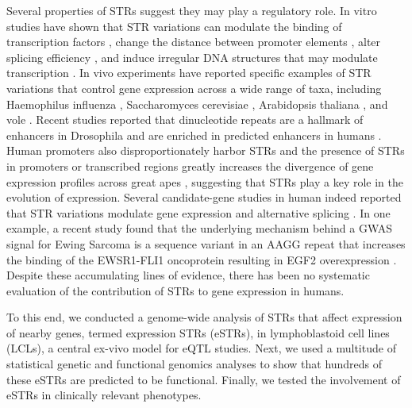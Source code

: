 Several properties of STRs suggest they may play a regulatory role. In vitro studies have shown that STR variations can modulate the binding of transcription factors \cite{ContenteDittmerKochEtAl2002,MartinMakepeaceHillEtAl2005}, change the distance between promoter elements \cite{WillemsPaulHeideEtAl1990,YogevRosengartenWatson-McKownEtAl1991}, alter splicing efficiency \cite{HefferonGromanYurkEtAl2004,HuiHungHeinerEtAl2005}, and induce irregular DNA structures that may modulate transcription \cite{RothenburgKoch-NolteRichEtAl2001}. In vivo experiments have reported specific examples of STR variations that control gene expression across a wide range of taxa, including Haemophilus influenza \cite{WeiserLoveMoxon1989}, Saccharomyces cerevisiae \cite{VincesLegendreCaldaraEtAl2009}, Arabidopsis thaliana \cite{SureshkumarTodescoSchneebergerEtAl2009}, and vole \cite{HammockYoung2005}. Recent studies reported that dinucleotide repeats are a hallmark of enhancers in Drosophila and are enriched in predicted enhancers in humans \cite{Yanez-CunaArnoldStampfelEtAl2014}. Human promoters also disproportionately harbor STRs \cite{SawayaBagshawBuschiazzoEtAl2013} and the presence of STRs in promoters or transcribed regions greatly increases the divergence of gene expression profiles across great apes \cite{SonayCarvalhoRobinsonEtAl2015}, suggesting that STRs play a key role in the evolution of expression. Several candidate-gene studies in human indeed reported that STR variations modulate gene expression \cite{GebhardtZankerBrandt1999,ShimajiriArimaTanimotoEtAl1999,WarpehaXuLiuEtAl1999,ContenteDittmerKochEtAl2002,RockmanWray2002} and alternative splicing \cite{HuiStanglLaneEtAl2003,HefferonGromanYurkEtAl2004,SathasivamNeuederGipsonEtAl2013}. In one example, a recent study found that the underlying mechanism behind a GWAS signal for Ewing Sarcoma is a sequence variant in an AAGG repeat that increases the binding of the EWSR1-FLI1 oncoprotein resulting in EGF2 overexpression \cite{GrunewaldBernardGilardi-HebenstreitEtAl2015}. Despite these accumulating lines of evidence, there has been no systematic evaluation of the contribution of STRs to gene expression in humans. 

To this end, we conducted a genome-wide analysis of STRs that affect expression of nearby genes, termed expression STRs (eSTRs), in lymphoblastoid cell lines (LCLs), a central ex-vivo model for eQTL studies. Next, we used a multitude of statistical genetic and functional genomics analyses to show that hundreds of these eSTRs are predicted to be functional. Finally, we tested the involvement of eSTRs in clinically relevant phenotypes.

